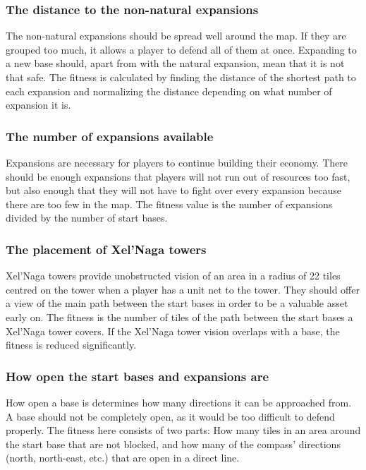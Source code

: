 	\subsubsection*{The distance to the non-natural expansions}
	The non-natural expansions should be spread well around the map. If they are grouped too much, it allows a player to defend all of them at once. Expanding to a new base should, apart from with the natural expansion, mean that it is not that safe. The fitness is calculated by finding the distance of the shortest path to each expansion and normalizing the distance depending on what number of expansion it is.

	\subsubsection*{The number of expansions available}
	Expansions are necessary for players to continue building their economy. There should be enough expansions that players will not run out of resources too fast, but also enough that they will not have to fight over every expansion because there are too few in the map. The fitness value is the number of expansions divided by the number of start bases.

	\subsubsection*{The placement of Xel'Naga towers}
	Xel'Naga towers provide unobstructed vision of an area in a radius of 22 tiles centred on the tower when a player has a unit net to the tower. They should offer a view of the main path between the start bases in order to be a valuable asset early on. The fitness is the number of tiles of the path between the start bases a Xel'Naga tower covers. If the Xel'Naga tower vision overlaps with a base, the fitness is reduced significantly.

	\subsubsection*{How open the start bases and expansions are}
	How open a base is determines how many directions it can be approached from. A base should not be completely open, as it would be too difficult to defend properly. The fitness here consists of two parts: How many tiles in an area around the start base that are not blocked, and how many of the compass' directions (north, north-east, etc.) that are open in a direct line.

